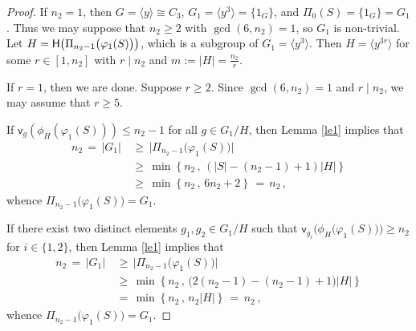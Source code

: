 \documentclass[leqno,a4paper]{amsart}
\def\HH{{\sf H}}
\theoremstyle{plain}
\theoremstyle{definition}
\numberwithin{equation}{section}
\begin{document}
	
	\begin{proof}
        If $n_2 = 1$, then $G = \langle y \rangle \cong C_3$, $G_1 = \langle y^{3} \rangle = \{ 1_G \}$, and $\Pi_{0} (S) = \{ 1_G \} = G_1$. Thus we may suppose that $n_2 \ge 2$ with $\gcd(6, n_2) = 1$, so  $G_1$ is non-trivial.
		Let $H = \HH \big( \Pi_{n_2-1} \big( \varphi_1(S) \big) \big)$, which is a subgroup of $G_1=\langle y^3\rangle$. Then $H=\langle y^{3r}\rangle$ for some $r \in [1, n_2]$ with $r \mid n_2$ and $m := |H| = \frac{n_2}{r}$.
		
		
        If $r=1$, then we are done. Suppose $r\ge 2$. Since $\gcd(6, n_2) = 1$ and $r \mid n_2$, we may assume that $r \ge 5$.

		If $\mathsf v_{g}(\phi_H(\varphi_1(S)))\le n_2-1$  for all $g\in G_1/H$,  then Lemma \ref{le1} implies that
        \begin{align*}
			n_2 \, = \, |G_1| \, &\ge \, \big|\Pi_{n_2-1} \big( \varphi_1 (S) \big)\big| \\
			&\ge \,  \min\left\{n_2 \, , \, (|S|-(n_2-1)+1)|H|\right\} \\
			&\ge \, \min\left\{n_2 \, , \, 6n_2 + 2\right\} \, = \, n_2 \,,
		\end{align*}
		whence $\Pi_{n_2-1} \big( \varphi_1 (S) \big) = G_1$.
		
		If there exist two distinct elements $g_1, g_2\in G_1/H$ such that $\mathsf v_{g_i} \big( \phi_H \big(\varphi_1(S) \big) \big) \ge n_2$ for $i \in \{1,2\}$, then Lemma \ref{le1} implies that
            \begin{align*}
				n_2 \, = \, |G_1| \, &\ge \, \big| \Pi_{n_2-1} \big( \varphi_1(S) \big) \big| \\
				&\ge \, \min\left\{ n_2 \, , \, \big( 2(n_2 - 1) -(n_2-1)+1 \big)|H| \right\} \\
				&= \, \min\left\{ n_2 \, , \, n_2 |H| \right\} \, = \, n_2 \,,
			\end{align*}
		whence $\Pi_{n_2-1} \big( \varphi_1 (S) \big) = G_1$.


\end{proof}
\end{document}
